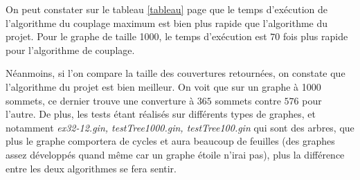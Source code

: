   On peut constater sur le tableau \ref{tableau} page \pageref{tableau}
  que le temps d'exécution de l'algorithme du couplage maximum est bien
  plus rapide que l'algorithme du projet. Pour le graphe de taille 1000,
  le temps d'exécution est $70$ fois plus rapide pour l'algorithme de
  couplage.

  Néanmoins, si l'on compare la taille des couvertures retournées, on
  constate que l'algorithme du projet est bien meilleur. On voit que sur
  un graphe à 1000 sommets, ce dernier trouve une converture à $365$
  sommets contre $576$ pour l'autre. De plus, les tests étant réalisés
  sur différents types de graphes, et notamment \emph{ex32-12.gin,
  testTree1000.gin, testTree100.gin} qui sont des arbres, que plus le
  graphe comportera de cycles et aura beaucoup de feuilles (des graphes
  assez développés quand même car un graphe étoile n'irai pas), plus la
  différence entre les deux algorithmes se fera sentir.
